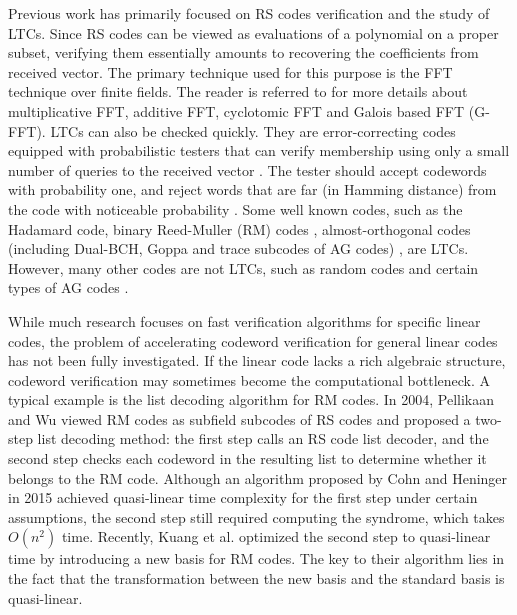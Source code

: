 \documentclass[a4paper, 10pt]{article}
\begin{document}
Previous work has primarily focused on RS codes verification and the study of LTCs. Since RS codes can be viewed as evaluations of a polynomial on a proper subset, verifying them essentially amounts to recovering the coefficients from received vector. The primary technique used for this purpose is the FFT technique over finite fields. The reader is referred to  \cite{4395269} \cite{6176255} \cite{5910103} \cite{9925209} \cite{doi:10.1137/1.9781611977912.135} \cite{5625613} \cite{pollard1971fast} for more details about multiplicative FFT, additive FFT, cyclotomic FFT and Galois based FFT (G-FFT). LTCs can also be checked quickly. They are error-correcting codes equipped with probabilistic testers that can verify membership using only a small number of queries to the received vector \cite{10.1145/1162349.1162351}. The tester should accept codewords with probability one, and reject words that are far
(in Hamming distance) from the code with noticeable probability \cite{10.1007/978-3-642-15369-3_50}. Some well known codes, such as the Hadamard code, binary Reed-Muller (RM) codes \cite{1522661}, almost-orthogonal codes (including Dual-BCH, Goppa and  trace subcodes of AG codes) \cite{1530724}, are LTCs. However, many other codes are not LTCs, such as random codes and certain types of AG codes \cite{chen2009testing} \cite{10.1007/978-3-642-15369-3_50}.

While much research focuses on fast verification algorithms for specific linear codes, the problem of accelerating codeword verification for general linear codes has not been fully investigated. If the linear code lacks a rich algebraic structure, codeword verification may sometimes become the computational bottleneck. A typical example is the list decoding algorithm for RM codes. In 2004, Pellikaan and Wu \cite{1278668} viewed RM codes as subfield subcodes of RS codes and proposed a two-step list decoding method: the first step calls an RS code list decoder, and the second step checks each codeword in the resulting list to determine whether it belongs to the RM code. Although an algorithm proposed by Cohn and Heninger \cite{Cohn2015} in 2015 achieved quasi-linear time complexity for the first step under certain assumptions, the second step still required computing the syndrome, which takes $O(n^2)$ time. Recently, Kuang et al.\cite{11197050} optimized the second step to quasi-linear time by introducing a new basis for RM codes. The key to their algorithm lies in the fact that the transformation between the new basis and the standard basis is quasi-linear.
\end{document}
